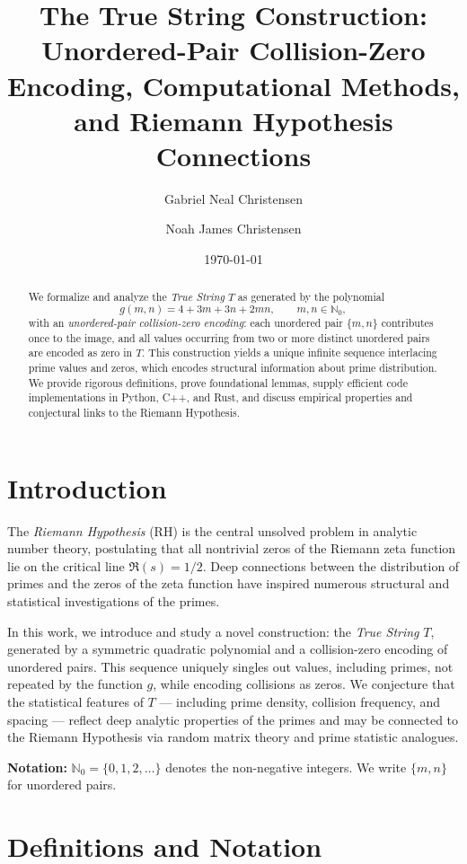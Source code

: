 \documentclass[12pt]{article}
\title{The True String Construction: Unordered-Pair Collision-Zero Encoding, Computational Methods, and Riemann Hypothesis Connections}
\author{Gabriel Neal Christensen \and Noah James Christensen}
\date{\today}
\theoremstyle{definition}
\theoremstyle{plain}
\begin{document}
\maketitle

\begin{abstract}
We formalize and analyze the \emph{True String} \(T\) as generated by the polynomial
\[
g(m,n)=4+3m+3n+2mn, \qquad m,n\in\mathbb{N}_0,
\]
with an \emph{unordered-pair collision-zero encoding}: each unordered pair \(\{m,n\}\) contributes once to the image, and all values occurring from two or more distinct unordered pairs are encoded as zero in \(T\). This construction yields a unique infinite sequence interlacing prime values and zeros, which encodes structural information about prime distribution. We provide rigorous definitions, prove foundational lemmas, supply efficient code implementations in Python, C++, and Rust, and discuss empirical properties and conjectural links to the Riemann Hypothesis.
\end{abstract}

\tableofcontents
\newpage

\section{Introduction}

The \emph{Riemann Hypothesis} (RH) is the central unsolved problem in analytic number theory, postulating that all nontrivial zeros of the Riemann zeta function lie on the critical line \(\Re(s) = 1/2\). Deep connections between the distribution of primes and the zeros of the zeta function have inspired numerous structural and statistical investigations of the primes.

In this work, we introduce and study a novel construction: the \emph{True String} \(T\), generated by a symmetric quadratic polynomial and a collision-zero encoding of unordered pairs. This sequence uniquely singles out values, including primes, not repeated by the function \(g\), while encoding collisions as zeros. We conjecture that the statistical features of \(T\) --- including prime density, collision frequency, and spacing --- reflect deep analytic properties of the primes and may be connected to the Riemann Hypothesis via random matrix theory and prime statistic analogues.

\bigskip
\noindent\textbf{Notation:} \(\mathbb{N}_0 = \{0,1,2,\ldots\}\) denotes the non-negative integers. We write \(\{m,n\}\) for unordered pairs.

\section{Definitions and Notation}
\end{document}

